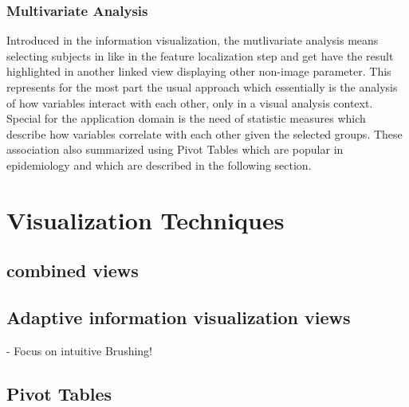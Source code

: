 \documentclass[journal]{style/vgtc}           %
\begin{document}
\subsubsection{Multivariate Analysis}
Introduced in the information visualization, the mutlivariate analysis means selecting subjects in like in the feature localization step and get have the result highlighted in another linked view displaying other non-image parameter.
%
This represents for the most part the usual approach which essentially is the analysis of how variables interact with each other, only in a visual analysis context.
%
Special for the application domain is the need of statistic measures which describe how variables correlate with each other given the selected groups.
%
These association also summarized using Pivot Tables which are popular in epidemiology and which are described in the following section.

\section{Visualization Techniques}
\subsection{combined views}
\subsection{Adaptive information visualization views}
- Focus on intuitive Brushing!
\subsection{Pivot Tables}
\end{document}

